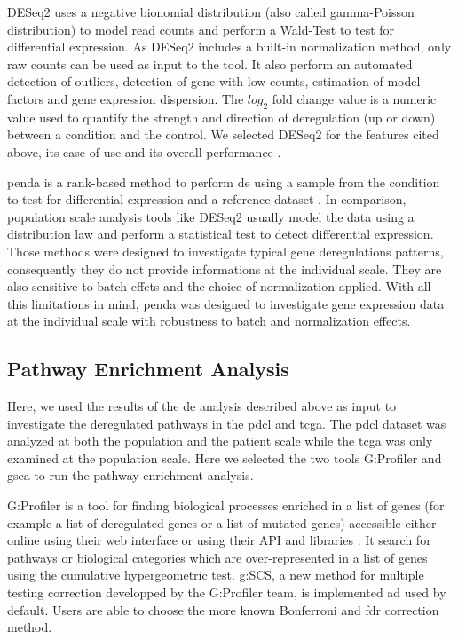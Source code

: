 DESeq2 uses a negative bionomial distribution (also called gamma-Poisson distribution) to model read counts and perform a Wald-Test to test for differential expression.
As DESeq2 includes a built-in normalization method, only raw counts can be used as input to the tool.
It also perform an automated detection of outliers, detection of gene with low counts, estimation of model factors and gene expression dispersion.
The $log_2$ fold change value is a numeric value used to quantify the strength and direction of deregulation (up or down) between a condition and the control.
We selected DESeq2 for the features cited above, its ease of use and its overall performance \cite*{Love2014}.

\acrshort{penda} is a rank-based method to perform \acrshort{de} using a sample from the condition to test for differential expression and a reference dataset \cite*{Richard2020}.
In comparison, population scale analysis tools like DESeq2 usually model the data using a distribution law and perform a statistical test to detect differential expression.
Those methods were designed to investigate typical gene deregulations patterns, consequently they do not provide informations at the individual scale.
They are also sensitive to batch effets and the choice of normalization applied.
With all this limitations in mind, \acrshort{penda} was designed to investigate gene expression data at the individual scale with robustness to batch and normalization effects.

\subsection{Pathway Enrichment Analysis}

Here, we used the results of the \acrlong{de} analysis described above as input to investigate the deregulated pathways in the \acrshort{pdcl} and \acrshort{tcga}.
The \acrlong{pdcl} dataset was analyzed at both the population and the patient scale while the \acrshort{tcga} was only examined at the population scale.
Here we selected the two tools G:Profiler and \acrfull{gsea} to run the pathway enrichment analysis.

G:Profiler is a tool for finding biological processes enriched in a list of genes (for example a list of deregulated genes or a list of mutated genes) accessible either online using their web interface or using their API and libraries \cite*{Raudvere2019}.
It search for pathways or biological categories which are over-represented in a list of genes using the cumulative hypergeometric test.
g:SCS, a new method for multiple testing correction developped by the G:Profiler team, is implemented ad used by default.
Users are able to choose the more known Bonferroni and \acrshort{fdr} correction method.

